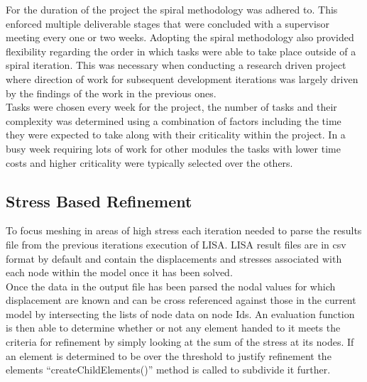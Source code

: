 \noindent
For the duration of the project the spiral methodology was adhered to. This enforced multiple deliverable stages that were concluded with a supervisor meeting every one or two weeks. Adopting the spiral methodology also provided flexibility regarding the order in which tasks were able to take place outside of a spiral iteration. This was necessary when conducting a research driven project where direction of work for subsequent development iterations was largely driven by the  findings of the work in the previous ones. \\

\noindent
Tasks were chosen every week for the project, the number of tasks and their complexity was determined using a combination of factors including the time they were expected to take along with their criticality within the project. In a busy week requiring lots of work for other modules the tasks with lower time costs and higher criticality were typically selected over the others.

\subsection{Stress Based Refinement}
To focus meshing in areas of high stress each iteration needed to parse the results file from the previous iterations execution of LISA. LISA result files are in csv format by default and contain the displacements and stresses associated with each node within the model once it has been solved. \\

\noindent
Once the data in the output file has been parsed the nodal values for which displacement are known and can be cross referenced against those in the current model by intersecting the lists of node data on node Ids. An evaluation function is then able to determine whether or not any element handed to it meets the criteria for refinement by simply looking at the sum of the stress at its nodes. If an element is determined to be over the threshold to justify refinement the elements ``createChildElements()'' method is called to subdivide it further. \\


